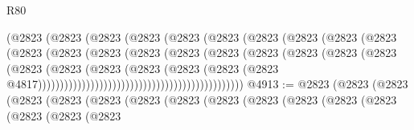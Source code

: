 \begin{lexlean}{R80}
\begin{coremodule}
                                            (@2823
                                              (@2823
                                                (@2823
                                                  (@2823
                                                    (@2823
                                                      (@2823
                                                        (@2823
                                                          (@2823
                                                            (@2823
                                                              (@2823
                                                                (@2823
                                                                  (@2823
                                                                    (@2823
                                                                      (@2823
                                                                        (@2823
                                                                          (@2823
                                                                            (@2823
                                                                              (@2823
                                                                                (@2823
                                                                                  (@2823
                                                                                    (@2823
                                                                                      (@2823
                                                                                        (@2823
                                                                                          (@2823
                                                                                            (@2823
                                                                                              (@2823
                                                                                                (@2823
                                                                                                  @4817)))))))))))))))))))))))))))))))))))))))))))))))
@4913 := @2823
    (@2823
      (@2823
        (@2823
          (@2823
            (@2823
              (@2823
                (@2823
                  (@2823
                    (@2823
                      (@2823
                        (@2823
                          (@2823
                            (@2823
                              (@2823
                                (@2823

\end{coremodule}
\end{lexlean}
